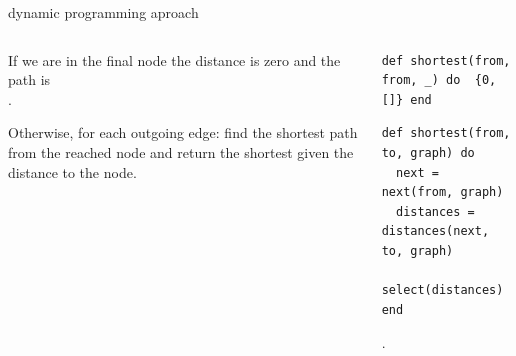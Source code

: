 \begin{frame}[fragile]{dynamic programming aproach}

\begin{columns}
 \begin{column}{0.4\linewidth}
  If we are in the final node the distance is zero and the path is \[\].

  \vspace{10pt}
  Otherwise, for each outgoing edge: find the shortest path from the
  reached node and return the shortest given the distance to the node.

 \end{column}
 \begin{column}{0.6\linewidth}
  \begin{verbatim}
def shortest(from, from, _) do  {0, []} end
  \end{verbatim}
  \pause
  \begin{verbatim}
def shortest(from, to, graph) do
  next = next(from, graph)
  distances = distances(next, to, graph)
  select(distances)
end
  \end{verbatim}
  .
 \end{column}
\end{columns}

\end{frame}

